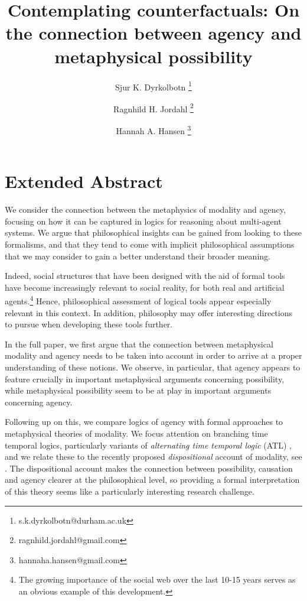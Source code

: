 \documentclass{article}
\begin{document}
\title{Contemplating counterfactuals: On the connection between agency and metaphysical possibility}
\author[1]{Sjur K. Dyrkolbotn \thanks{s.k.dyrkolbotn@durham.ac.uk}}
\author[2]{Ragnhild H. Jordahl \thanks{ragnhild.jordahl@gmail.com}}
\author[3]{Hannah A. Hansen \thanks{hannaha.hansen@gmail.com}}

\date{}
\maketitle

\section*{Extended Abstract}

We consider the connection between the metaphysics of modality and agency, focusing on how it can be captured in logics for reasoning about multi-agent systems. We argue that philosophical insights can be gained from looking to these formalisms, and that they tend to come with implicit philosophical assumptions that we may consider to gain a better understand their broader meaning.

Indeed, social structures that have been designed with the aid of formal tools have become increasingly relevant to social reality, for both real and artificial agents.\footnote{The growing importance of the social web over the last 10-15 years serves as an obvious example of this development.} Hence, philosophical assessment of logical tools appear especially relevant in this context. In addition, philosophy may offer interesting directions to pursue when developing these tools further.

In the full paper, we first argue that the connection between metaphysical modality and agency needs to be taken into account in order to arrive at a proper understanding of these notions. We observe, in particular, that agency appears to feature crucially in important metaphysical arguments concerning possibility, while metaphysical possibility seem to be at play in important arguments concerning agency.

Following up on this, we compare logics of agency with formal approaches to metaphysical theories of modality. We focus attention on branching time temporal logics, particularly variants of \emph{alternating time temporal logic} (ATL) \cite{atl}, and we relate these to the recently proposed \emph{dispositional} account of modality, see \cite{dispmod,MwPw}. The dispositional account makes the connection between possibility, causation and agency clearer at the philosophical level, so providing a formal interpretation of this theory seems like a particularly interesting research challenge.
\end{document}

